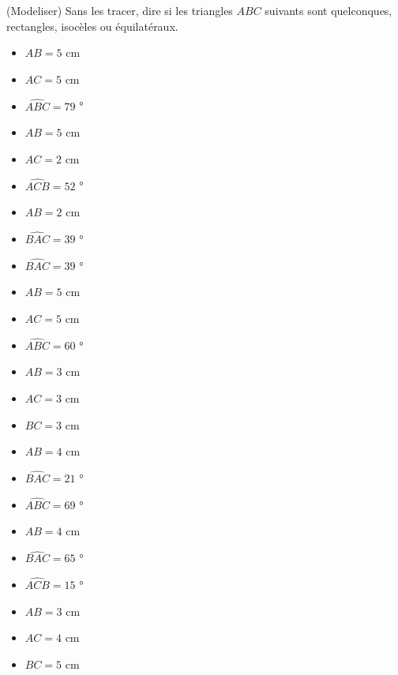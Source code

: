  (Modeliser) Sans les tracer, dire si les triangles $ABC$ suivants sont quelconques, rectangles, isocèles ou équilatéraux.

\begin{multicols}{4}
\begin{itemize}
\item $AB=5$ cm
\item $AC=5$ cm
\item $\widehat{ABC}=79$ °
\end{itemize}

\begin{itemize}
\item $AB=5$ cm
\item $AC=2$ cm
\item $\widehat{ACB}=52$ °
\end{itemize}\columnbreak

\begin{itemize}
\item $AB=2$ cm
\item $\widehat{BAC}=39$ °
\item $\widehat{BAC}=39$ °
\end{itemize}

\begin{itemize}
\item $AB=5$ cm
\item $AC=5$ cm
\item $\widehat{ABC}=60$ °
\end{itemize}

\begin{itemize}
\item $AB=3$ cm
\item $AC=3$ cm
\item $BC=3$ cm
\end{itemize}

\begin{itemize}
\item $AB=4$ cm
\item $\widehat{BAC}=21$ °
\item $\widehat{ABC}=69$ °
\end{itemize}

\begin{itemize}
\item $AB=4$ cm
\item $\widehat{BAC}=65$ °
\item $\widehat{ACB}=15$ °
\end{itemize}

\begin{itemize}
    \item $AB=3$ cm
    \item $AC=4$ cm
    \item $BC=5$ cm
\end{itemize}

\end{multicols}